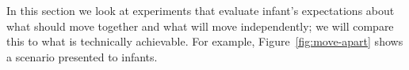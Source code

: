 In this section we look at experiments that evaluate infant's
expectations about what should move together and what will move
independently; we will compare this to what is technically achievable.
For example, Figure~\ref{fig:move-apart} shows a scenario presented to
infants.




\newpage

\ 

\newpage


